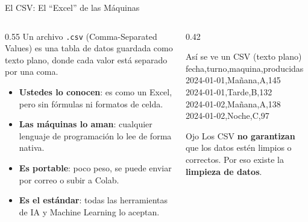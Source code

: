 \documentclass[aspectratio=169]{beamer}
\newcommand{\tech}[1]{\texttt{\textcolor{mainColor}{#1}}}
\begin{document}

\begin{frame}{El CSV: El ``Excel'' de las Máquinas}
  \begin{columns}[T]
    \begin{column}{0.55\textwidth}
      \small
      Un archivo \tech{.csv} (Comma-Separated Values) es una tabla de datos guardada como texto plano, donde cada valor está separado por una coma.

      \vspace{0.3cm}
      \begin{itemize}\setlength\itemsep{5pt}
        \item \textbf{Ustedes lo conocen}: es como un Excel, pero sin fórmulas ni formatos de celda.
        \item \textbf{Las máquinas lo aman}: cualquier lenguaje de programación lo lee de forma nativa.
        \item \textbf{Es portable}: poco peso, se puede enviar por correo o subir a Colab.
        \item \textbf{Es el estándar}: todas las herramientas de IA y Machine Learning lo aceptan.
      \end{itemize}
    \end{column}
    \begin{column}{0.42\textwidth}
      \begin{conceptbox}{\faFileCsv\enspace Así se ve un CSV (texto plano)}
        {\small\ttfamily\selectfont
          fecha,turno,maquina,producidas\\
          2024-01-01,Mañana,A,145\\
          2024-01-01,Tarde,B,132\\
          2024-01-02,Mañana,A,138\\
          2024-01-02,Noche,C,97
        }
      \end{conceptbox}
      \vspace{0.2cm}
      \begin{alertblock}{\faExclamationTriangle\enspace Ojo}
        \small
        Los CSV \textbf{no garantizan} que los datos estén limpios o correctos. Por eso existe la \textbf{limpieza de datos}.
      \end{alertblock}
    \end{column}
  \end{columns}
\end{frame}
\end{document}
